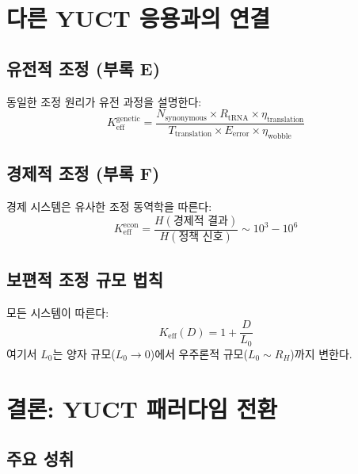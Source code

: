 \documentclass[11pt,a4paper]{article}
\theoremstyle{remark}
\newcommand{\Keff}{K_{\mathrm{eff}}}
\begin{document}
	\section{다른 YUCT 응용과의 연결}
	\label{sec:connections}
	
	\subsection{유전적 조정 (부록 E)}
	
	동일한 조정 원리가 유전 과정을 설명한다:
	\[
	K_{\text{eff}}^{\text{genetic}} = \frac{N_{\text{synonymous}} \times R_{\text{tRNA}} \times \eta_{\text{translation}}}{T_{\text{translation}} \times E_{\text{error}} \times \eta_{\text{wobble}}}
	\]
	
	\subsection{경제적 조정 (부록 F)}
	
	경제 시스템은 유사한 조정 동역학을 따른다:
	\[
	K_{\text{eff}}^{\text{econ}} = \frac{H(\text{경제적 결과})}{H(\text{정책 신호})} \sim 10^3-10^6
	\]
	
	\subsection{보편적 조정 규모 법칙}
	
	모든 시스템이 따른다:
	\[
	\boxed{\Keff(D) = 1 + \frac{D}{L_0}}
	\]
	여기서 $L_0$는 양자 규모($L_0 \to 0$)에서 우주론적 규모($L_0 \sim R_H$)까지 변한다.
	
	\section{결론: YUCT 패러다임 전환}
	\label{sec:conclusion}
	
	\subsection{주요 성취}
	
\end{document}
